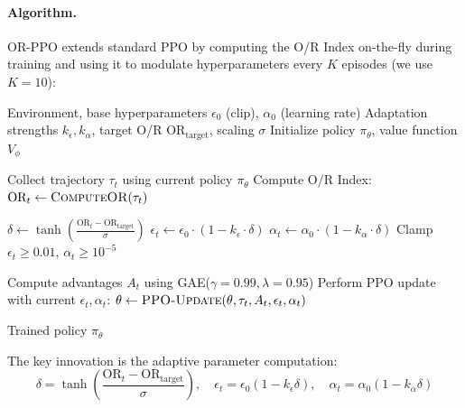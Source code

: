\paragraph{Algorithm.}

OR-PPO extends standard PPO by computing the O/R Index on-the-fly during training and using it to modulate hyperparameters every $K$ episodes (we use $K = 10$):

\begin{algorithm}[t]
\caption{OR-PPO: O/R Index-Guided Proximal Policy Optimization}
\label{alg:or_ppo}
\begin{algorithmic}[1]
\Require Environment, base hyperparameters $\epsilon_0$ (clip), $\alpha_0$ (learning rate)
\Require Adaptation strengths $k_\epsilon, k_\alpha$, target O/R $\text{OR}_{\text{target}}$, scaling $\sigma$
\State Initialize policy $\pi_\theta$, value function $V_\phi$

    \State Collect trajectory $\tau_t$ using current policy $\pi_\theta$
    \State Compute O/R Index: $\text{OR}_t \leftarrow \textsc{ComputeOR}(\tau_t)$ 

      
        \State $\delta \leftarrow \tanh\left(\frac{\text{OR}_t - \text{OR}_{\text{target}}}{\sigma}\right)$ 
        \State $\epsilon_t \leftarrow \epsilon_0 \cdot (1 - k_\epsilon \cdot \delta)$ 
        \State $\alpha_t \leftarrow \alpha_0 \cdot (1 - k_\alpha \cdot \delta)$ 
        \State Clamp $\epsilon_t \geq 0.01$, $\alpha_t \geq 10^{-5}$ 
    \EndIf

    \State Compute advantages $A_t$ using GAE($\gamma = 0.99, \lambda = 0.95$)
    \State Perform PPO update with current $\epsilon_t, \alpha_t$:
    \State \qquad $\theta \leftarrow \textsc{PPO-Update}(\theta, \tau_t, A_t, \epsilon_t, \alpha_t)$
\EndFor

\State \Return Trained policy $\pi_\theta$
\end{algorithmic}
\end{algorithm}

The key innovation is the adaptive parameter computation:
\begin{equation}
\delta = \tanh\left(\frac{\text{OR}_t - \text{OR}_{\text{target}}}{\sigma}\right), \quad
\epsilon_t = \epsilon_0 (1 - k_\epsilon \delta), \quad
\alpha_t = \alpha_0 (1 - k_\alpha \delta)
\end{equation}

